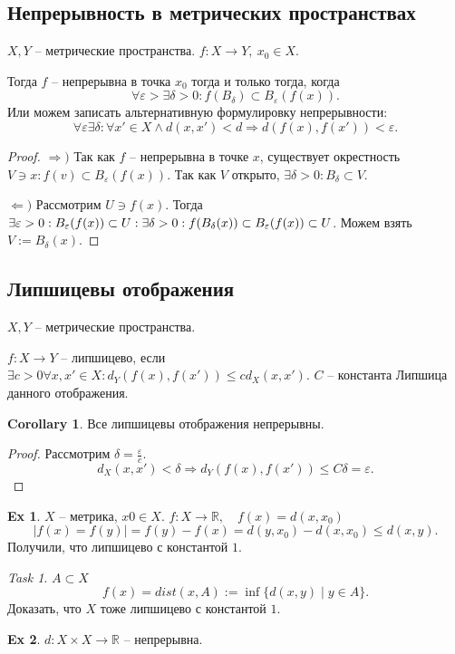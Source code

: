 \documentclass[11pt]{book}
\newcommand{\R}{\mathbb{R}}
\theoremstyle{definition}
\theoremstyle{plain}
\theoremstyle{plain}
\theoremstyle{definition}
\newtheorem*{ex}{Ex}
\newtheorem*{cor}{Corollary}
\theoremstyle{remark}
\newtheorem*{task}{Task}
\begin{document}
\subsection{Непрерывность в метрических пространствах}
\begin{thm}
    $X, Y$ -- метрические пространства.  $f: X \to  Y, ~ x_0 \in  X$.

    Тогда $f$ -- непрерывна в точка $x_0$ тогда и только тогда, когда 
    \[
	\forall  \varepsilon > \exists  \delta  >0: f(B_{ \delta }) \subset B_{ \varepsilon } (f(x))
    .\] 
    Или можем записать альтернативную формулировку непрерывности:
    \[
	\forall  \varepsilon  \exists \delta : \forall x' \in  X \wedge d(x, x') < d \Rightarrow  d(f(x) , f(x')) < \varepsilon 
    .\] 
\end{thm}
\begin{proof}
    $ \Rightarrow )$ Так как $f$ -- непрерывна в точке $x$, существует окрестность $V \ni x: f(v) \subset  B_{ \varepsilon }(f(x))$. Так как $V$ открыто, $\exists  \delta >0 : B_{ \delta } \subset  V$.

    $ \Leftarrow )$ Рассмотрим $U \ni f(x)$.
    Тогда $\exists  \varepsilon >0: B_{ \varepsilon }(f(x)) \subset U: \\
    \exists \delta  >0 : f(B_{\delta}(x)) \subset  B_{ \varepsilon } (f(x)) \subset  U$.
    Можем взять  $V:=B_{ \delta } (x)$.
\end{proof}
\subsection{Липшицевы отображения}
\begin{defn}
    $X, Y$ -- метрические пространства.

    $f: X \to  Y$ -- липшицево, если $\exists c > 0 \forall  x, x' \in  X: d_Y(f(x), f(x')) \le c d_X(x, x')$. $C$ -- константа Липшица данного отображения.
\end{defn}
\begin{cor}
    Все липшицевы отображения непрерывны.
\end{cor}
\begin{proof}
    Рассмотрим $ \delta = \frac{\varepsilon}{c}$. 
    \[
	d_X(x, x') < \delta  \Rightarrow d_Y(f(x), f(x')) \le C \delta = \varepsilon 
    .\] 
\end{proof}
\begin{ex}
    $X $ -- метрика, $x0 \in  X$.
    $f: X \to  \R, \quad f(x) = d(x, x_0)$
    \[
	|f(x) = f(y)| = f(y) - f(x) = d(y, x_0) - d(x, x_0) \le d(x, y)
    .\] 
    Получили, что липшицево с константой $1$.
\end{ex}
\begin{task}
    $A \subset  X$ 
    \[
	f(x) = dist(x, A) := \inf \{d(x, y) \mid y \in  A\}
    .\] 
    Доказать, что $X$ тоже липшицево с константой $1$.
\end{task}
\begin{ex}
    $d : X \times X \to  \R$ -- непрерывна.
\end{ex}
\end{document}
